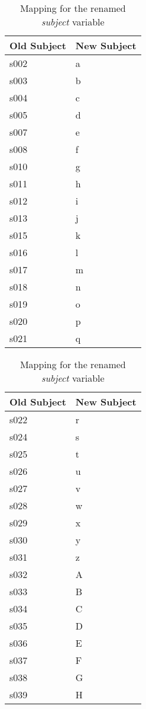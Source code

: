 \documentclass[]{article}
\begin{document}
\begin{table}[!htb]
  \caption{Mapping for the renamed \textit{subject} variable}
  \label{table:shortened.subject.map}
  \begin{minipage}{.33\linewidth}
    \centering
      
\begin{tabular}{ll}
\toprule
Old Subject & New Subject\\
\midrule
s002 & a\\
s003 & b\\
s004 & c\\
s005 & d\\
s007 & e\\
s008 & f\\
s010 & g\\
s011 & h\\
s012 & i\\
s013 & j\\
s015 & k\\
s016 & l\\
s017 & m\\
s018 & n\\
s019 & o\\
s020 & p\\
s021 & q\\
\bottomrule
\end{tabular}


  \end{minipage}%
  \begin{minipage}{.33\linewidth}
    \centering
      
\begin{tabular}{ll}
\toprule
Old Subject & New Subject\\
\midrule
s022 & r\\
s024 & s\\
s025 & t\\
s026 & u\\
s027 & v\\
s028 & w\\
s029 & x\\
s030 & y\\
s031 & z\\
s032 & A\\
s033 & B\\
s034 & C\\
s035 & D\\
s036 & E\\
s037 & F\\
s038 & G\\
s039 & H\\
\bottomrule
\end{tabular}



\end{minipage}
\end{table}
\end{document}
